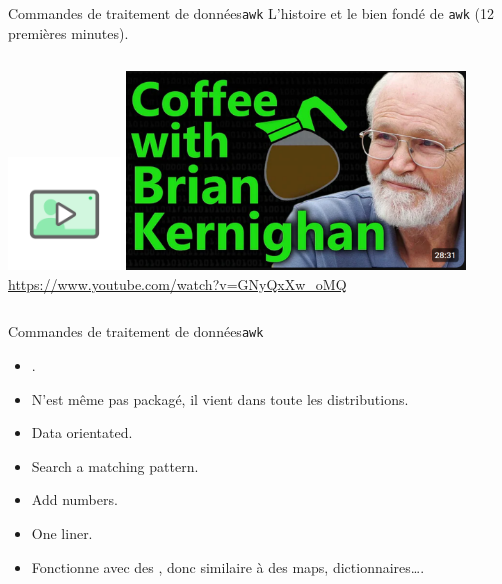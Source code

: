 \documentclass{beamer}
\begin{document}
    \begin{frame}{Commandes de traitement de données}{\lstinline{awk}}
        L'histoire et le bien fondé de \lstinline{awk} (12 premières minutes).
        \bigbreak
        \begin{columns}
            \centering
            \includegraphics[width=3cm]{image/digicomp-video}
            \includegraphics[width=9cm]{image/coffee-with-bk} \\ \url{https://www.youtube.com/watch?v=GNyQxXw_oMQ} \\
        \end{columns}
    \end{frame}

    \begin{frame}{Commandes de traitement de données}{\lstinline{awk}}
        \begin{itemize}
            \item {}.
            \item N'est même pas packagé, il vient dans toute les distributions.
            \item Data orientated.
            \item Search a matching pattern.
            \item Add numbers.
            \item One liner.
            \item Fonctionne avec des , donc similaire à des maps, dictionnaires\ldots.
        \end{itemize}
    \end{frame}
\end{document}
